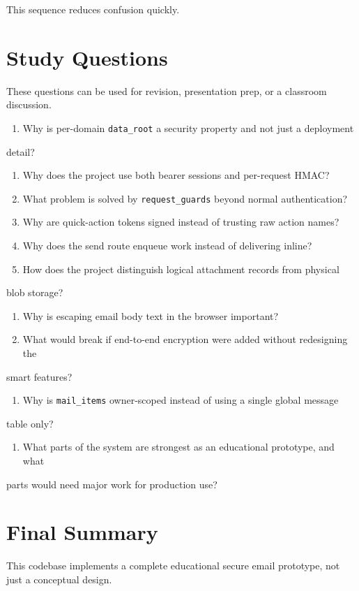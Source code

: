 \documentclass[11pt,a4paper]{article}
\begin{document}
This sequence reduces confusion quickly.


\section{Study Questions}

These questions can be used for revision, presentation prep, or a classroom discussion.

\begin{enumerate}
\item Why is per-domain \nolinkurl{data_root} a security property and not just a deployment
\end{enumerate}
detail?
\begin{enumerate}
\item Why does the project use both bearer sessions and per-request HMAC?
\item What problem is solved by \nolinkurl{request_guards} beyond normal authentication?
\item Why are quick-action tokens signed instead of trusting raw action names?
\item Why does the send route enqueue work instead of delivering inline?
\item How does the project distinguish logical attachment records from physical
\end{enumerate}
blob storage?
\begin{enumerate}
\item Why is escaping email body text in the browser important?
\item What would break if end-to-end encryption were added without redesigning the
\end{enumerate}
smart features?
\begin{enumerate}
\item Why is \nolinkurl{mail_items} owner-scoped instead of using a single global message
\end{enumerate}
table only?
\begin{enumerate}
\item What parts of the system are strongest as an educational prototype, and what
\end{enumerate}
parts would need major work for production use?


\section{Final Summary}

This codebase implements a complete educational secure email prototype, not just a conceptual design.
\end{document}
